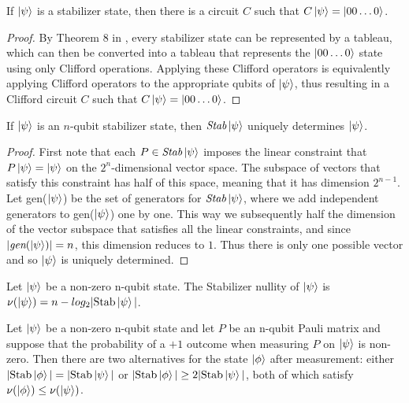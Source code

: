 \documentclass[12pt]{dalthesis}
\begin{document}
\begin{theorem}
If $\ket{\psi}$ is a stabilizer state, then there is a circuit $C$ such that $C\ket{\psi} = \ket{00 \dots 0}$.
\end{theorem}
\begin{proof}
By Theorem 8 in \cite{}, every stabilizer state can be represented by a tableau, which can then be converted into a tableau that represents the $\ket{00 \dots 0}$ state using only Clifford operations. Applying these Clifford operators is equivalently applying Clifford operators to the appropriate qubits of $\ket{\psi}$, thus resulting in a Clifford circuit $C$ such that $C\ket{\psi} = \ket{00 \dots 0}$. 
\end{proof}

\begin{theorem}
If $\ket{\psi}$ is an $n$-qubit stabilizer state, then $\textit{Stab}\ket{\psi}$ uniquely determines $\ket{\psi}$.
\end{theorem}
\begin{proof}
First note that each $P \in \textit{Stab}\ket{\psi}$ imposes the linear constraint that $P\ket{\psi} = \ket{\psi}$ on the $2^n$-dimensional vector space. The subspace of vectors that satisfy this constraint has half of this space, meaning that it has dimension $2^{n-1}$. Let gen($\ket{\psi}$) be the set of generators for $\textit{Stab}\ket{\psi}$, where we add independent generators to gen($\ket{\psi}$) one by one. This way we subsequently half the dimension of the vector subspace that satisfies all the linear constraints, and since $|\textit{gen}(\ket{\psi})| = n$, this dimension reduces to $1$. Thus there is only one possible vector and so $\ket{\psi}$ is uniquely determined.
\end{proof}


\begin{definition}
Let $\ket{\psi}$ be a non-zero n-qubit state. The Stabilizer nullity of $\ket{\psi}$ is $\nu(\ket{\psi}) = n - log_2 |\text{Stab}\ket{\psi}|$.
\end{definition}

\begin{proposition}
Let $\ket{\psi}$ be a non-zero n-qubit state and let $P$ be an n-qubit Pauli matrix and suppose that the probability of a $+1$ outcome when measuring $P$ on $\ket{\psi}$ is non-zero. Then there are two alternatives for the state $\ket{\phi}$ after measurement: either $|\text{Stab}\ket{\phi}| = |\text{Stab}\ket{\psi}|$ or $|\text{Stab}\ket{\phi}| \geq 2|\text{Stab}\ket{\psi}|$, both of which satisfy $\nu(\ket{\phi}) \leq \nu(\ket{\psi})$.
\end{proposition}
\end{document}
